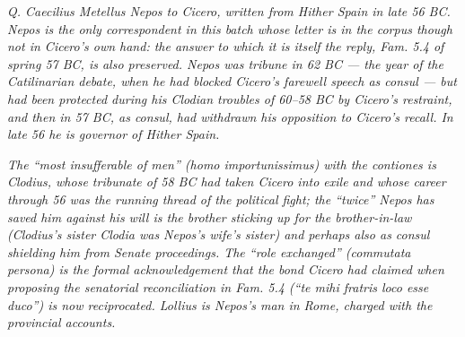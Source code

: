 
\textit{Q. Caecilius Metellus Nepos to Cicero, written from
Hither Spain in late 56 BC. Nepos is the only correspondent
in this batch whose letter is in the corpus though not in
Cicero's own hand: the answer to which it is itself the
reply, \textit{Fam.} 5.4 of spring 57 BC, is also preserved.
Nepos was tribune in 62 BC --- the year of the Catilinarian
debate, when he had blocked Cicero's farewell speech as
consul --- but had been protected during his Clodian troubles
of 60--58 BC by Cicero's restraint, and then in 57 BC, as
consul, had withdrawn his opposition to Cicero's recall. In
late 56 he is governor of Hither Spain.}

\textit{The ``most insufferable of men'' \textit{(homo
importunissimus)} with the contiones is Clodius, whose tribunate
of 58 BC had taken Cicero into exile and whose career through
56 was the running thread of the political fight; the
``twice'' Nepos has saved him against his will is the brother
sticking up for the brother-in-law (Clodius's sister Clodia
was Nepos's wife's sister) and perhaps also as consul shielding
him from Senate proceedings. The ``role exchanged'' \textit{(commutata
persona)} is the formal acknowledgement that the bond Cicero
had claimed when proposing the senatorial reconciliation in
\textit{Fam.} 5.4 (``\textit{te mihi fratris loco esse duco}'')
is now reciprocated. Lollius is Nepos's man in Rome, charged
with the provincial accounts.}
